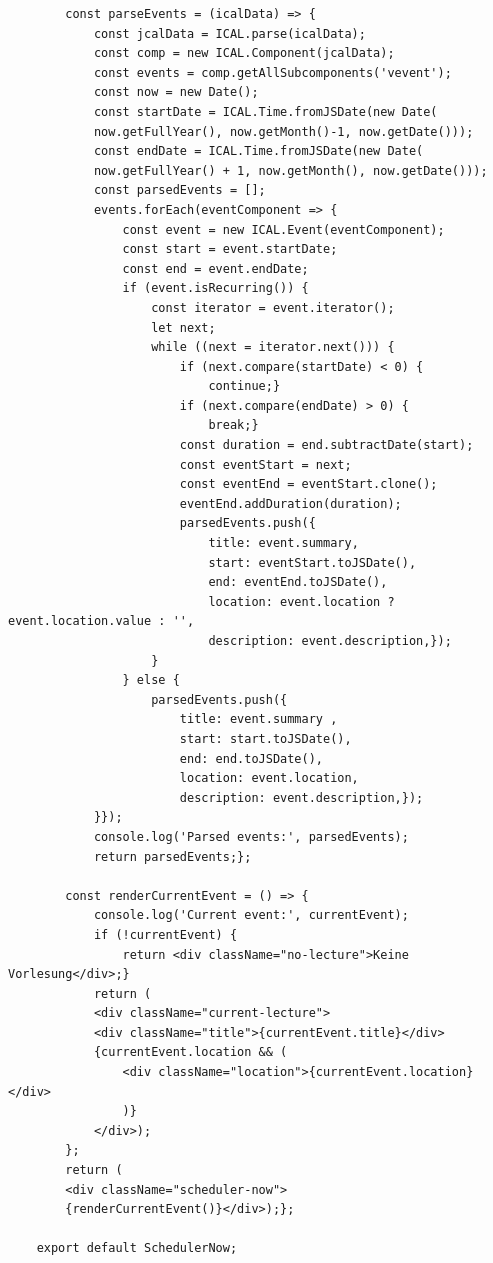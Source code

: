 \begin{lstlisting}
		const parseEvents = (icalData) => {
			const jcalData = ICAL.parse(icalData);
			const comp = new ICAL.Component(jcalData);
			const events = comp.getAllSubcomponents('vevent');
			const now = new Date();
			const startDate = ICAL.Time.fromJSDate(new Date(
			now.getFullYear(), now.getMonth()-1, now.getDate()));
			const endDate = ICAL.Time.fromJSDate(new Date(
			now.getFullYear() + 1, now.getMonth(), now.getDate()));
			const parsedEvents = [];
			events.forEach(eventComponent => {
				const event = new ICAL.Event(eventComponent);
				const start = event.startDate;
				const end = event.endDate;
				if (event.isRecurring()) {
					const iterator = event.iterator();
					let next;
					while ((next = iterator.next())) {
						if (next.compare(startDate) < 0) {
							continue;}
						if (next.compare(endDate) > 0) {
							break;}
						const duration = end.subtractDate(start);
						const eventStart = next;
						const eventEnd = eventStart.clone();
						eventEnd.addDuration(duration);
						parsedEvents.push({
							title: event.summary,
							start: eventStart.toJSDate(),
							end: eventEnd.toJSDate(),
							location: event.location ? event.location.value : '',
							description: event.description,});
					}
				} else {
					parsedEvents.push({
						title: event.summary ,
						start: start.toJSDate(),
						end: end.toJSDate(),
						location: event.location,
						description: event.description,});
			}});
			console.log('Parsed events:', parsedEvents);
			return parsedEvents;};
		
		const renderCurrentEvent = () => {
			console.log('Current event:', currentEvent);
			if (!currentEvent) {
				return <div className="no-lecture">Keine Vorlesung</div>;}
			return (
			<div className="current-lecture">
			<div className="title">{currentEvent.title}</div>
			{currentEvent.location && (
				<div className="location">{currentEvent.location}</div>
				)}
			</div>);
		};
		return (
		<div className="scheduler-now">
		{renderCurrentEvent()}</div>);};
	
	export default SchedulerNow;
\end{lstlisting}

